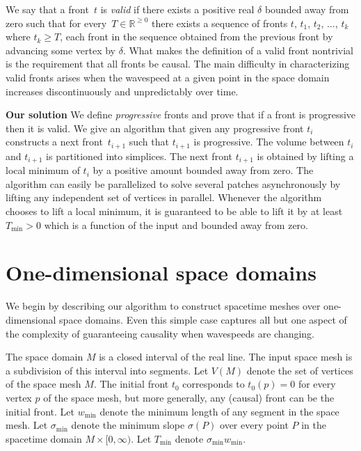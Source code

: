 \documentclass[twocolumn]{article}
\def\Real{\ensuremath{\mathbb{R}}}
\def\minW{\ensuremath{w_{\text{min}}}}
\def\S{\ensuremath{\sigma}}
\def\minS{\ensuremath{\S_{\text{min}}}}
\def\minT{\ensuremath{T_{\text{min}}}}
\def\sp{\ensuremath{M}}
\def\fp{\ensuremath{P}}
\begin{document}
We say that a front~$t$ is \emph{valid} if there exists a positive
real $\delta$ bounded away from zero such that for every~$T \in
\Real^{\ge 0}$ there exists a sequence of fronts $t$, $t_1$, $t_2$,
$\ldots$, $t_k$ where $t_k \ge T$, each front in the sequence obtained
from the previous front by advancing some vertex by $\delta$.  What
makes the definition of a valid front nontrivial is the requirement
that all fronts be causal.  The main difficulty in characterizing
valid fronts arises when the wavespeed at a given point in the space
domain increases discontinuously and unpredictably over time.

\noindent\textbf{Our solution}
We define \emph{progressive} fronts and prove that if a front is
progressive then it is valid.  We give an algorithm that given any
progressive front $t_i$ constructs a next front~$t_{i+1}$ such that
$t_{i+1}$ is progressive.  The volume between $t_i$ and $t_{i+1}$ is
partitioned into simplices.  The next front $t_{i+1}$ is
obtained by lifting a local minimum of $t_i$ by a positive amount
bounded away from zero.  The algorithm can easily be parallelized to
solve several patches asynchronously by lifting any independent set of
vertices in parallel.  Whenever the algorithm chooses to lift a local
minimum, it is guaranteed to be able to lift it by at least $\minT >
0$ which is a function of the input and bounded away from zero.






\section{One-dimensional space domains}
\label{sec:1d}

We begin by describing our algorithm to construct spacetime meshes
over one-dimensional space domains.  Even this simple case captures
all but one aspect of the complexity of guaranteeing causality when
wavespeeds are changing.

The space domain $\sp$ is a closed interval of the real line.  The
input space mesh is a subdivision of this interval into segments.  Let
$V(\sp)$ denote the set of vertices of the space mesh $\sp$.  The
initial front $t_0$ corresponds to $t_0(p) = 0$ for every vertex $p$ of
the space mesh, but more generally, any (causal) front can be the
initial front.  Let $\minW$ denote the minimum length of any segment
in the space mesh.  Let $\minS$ denote the minimum slope $\S(\fp)$
over every point $\fp$ in the spacetime domain $\sp \times
[0,\infty)$.  Let $\minT$ denote $\minS \minW$.
\end{document}
